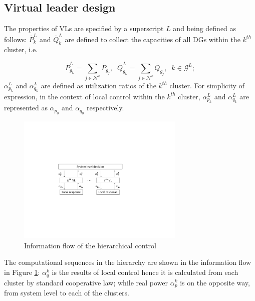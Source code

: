 \documentclass{article}
\begin{document}
\subsection{Virtual leader design}
The properties of VLs are specified by a superscript $L$ and being defined as follows: $\overline P^L_k$ and $\overline Q^L_k$ are defined to collect the capacities of all DGs within the $k^{th}$ cluster, i.e.

\begin{equation}
    \overline P^L_{g_k}=\sum_{j\in \mathcal{N}^{k}}\overline P_{g_j},\;\;\overline Q^L_{g_k}=\sum_{j\in \mathcal{N}^{k}}\overline Q_{g_j},\;\;k\in \mathcal{G}^{L}; \label{eq:vlpq}
\end{equation}
$\alpha^L_{p_k}$ and $\alpha^L_{q_k}$ are defined as utilization ratios of the $k^{th}$ cluster. For simplicity of expression, in the context of local control within the $k^{th}$ cluster, $\alpha^L_{p_k}$ and $\alpha^L_{q_k}$ are represented as $\alpha_{p_0}$ and $\alpha_{q_0}$ respectively. 

\begin{figure}[ht]
    \centering
    \includegraphics[width = 8cm]{pics/ctrl_strc.pdf}
    \caption{Information flow of the hierarchical control}
    \label{fig:ctrl_strc}
\end{figure}

The computational sequences in the hierarchy are shown in the information flow in Figure \ref{fig:ctrl_strc}: $\alpha_q^k$ is the results of local control hence it is calculated from each cluster by standard cooperative law; while real power $\alpha_p^k$ is on the opposite way, from system level to each of the clusters. 
\end{document}
